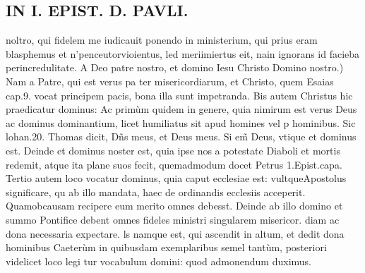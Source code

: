 \documentclass{article}
\begin{document}
\begin{pages}
\section*{IN I. EPIST. D. PAVLI. }
\marginpar{[ p.6 ]}\pstart  noltro, qui fidelem me iudicauit ponendo in ministerium, qui prius eram blasphemus et n'penceutorvioientus, led meriimiertus eit, nain ignorans id facieba perincredulitate.  \pend\pstart A Deo patre nostro, et domino Iesu Christo Domino nostro.) Nam a Patre, qui est verus pa ter misericordiarum, et Christo, quem Esaias cap.9. vocat principem pacis, bona illa sunt impetranda. Bis autem Christus hic praedicatur dominus: Ac primùm quidem in genere, quia nimirum est verus Deus ac dominus dominantium, licet humiliatus sit apud homines vel p hominibus. Sic lohan.20. Thomas dicit, Dñs meus, et Deus meus. Si em̃ Deus, vtique  et dominus est. Deinde et dominus noster est, quia ipse nos a potestate Diaboli et mortis redemit, atque  ita plane suos fecit, quemadmodum docet Petrus 1.Epist.capa. Tertio autem loco vocatur dominus, quia caput ecclesiae est: vultqueApostolus significare, qu ab illo mandata, haec de ordinandis ecclesiis acceperit. Quamobcausam recipere eum merito omnes debesst. Deinde ab illo domino et summo Pontifice debent omnes fideles ministri singularem misericor. diam ac dona necessaria expectare. ls namque  est, qui ascendit in altum, et dedit dona hominibus  Caeterùm in quibusdam exemplaribus semel tantùm, posteriori videlicet loco legi tur vocabulum domini: quod admonendum duximus.  \pend
{}
{}

\end{pages}
\end{document}

